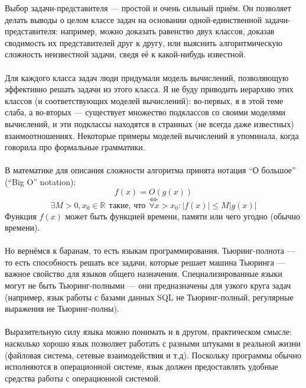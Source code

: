 \documentclass[11pt]{book}
\begin{document}
Выбор задачи-представителя --- простой и очень сильный приём.
Он позволяет делать выводы о целом классе задач на основании одной-единственной задачи-представителя:
например, можно доказать равенство двух классов, доказав сводимость их представителей друг к другу,
или выяснить алгоритмическую сложность неизвестной задачи, сведя её к какой-нибудь известной.
\\ \\
Для каждого класса задач люди придумали модель вычислений, позволяющую эффективно решать задачи из этого класса.
Я не буду приводить иерархию этих классов (и соответствующих моделей вычислений):
во-первых, я в этой теме слаба, а во-вторых --- существует множество подклассов со своими моделями вычислений,
и эти подклассы находятся в странных (не всегда даже известных) взаимоотношениях.
Некоторые примеры моделей вычислений я упоминала, когда говорила про формальные грамматики.
\\ \\
В математике для описания сложности алгоритма принята нотация ``О большое'' (``Big O'' notation):
$$f(x) = O(g(x))$$
$$\Leftrightarrow$$
$$\exists M>0, x_0 \in \mathbb{R} \ \ \text{такие, что}\ \  \forall x>x_0: |f(x)| \leq M |g(x)|$$
Функция $f(x)$ может быть функцией времени, памяти или чего угодно (обычно времени).
\\ \\
Но вернёмся к баранам, то есть языкам программирования.
Тьюринг-полнота --- то есть способность решать все задачи, которые решает машина Тьюринга ---
важное свойство для языков общего назначения.
Специализированные языки могут не быть Тьюринг-полными --- они предназначены для узкого круга задач
(например, язык работы с базами данных SQL не Тьюринг-полный, регулярные выражения не Тьюринг-полны).
\\ \\
Выразительную силу языка можно понимать и в другом, практическом смысле:
насколько хорошо язык позволяет работать с разными штуками в реальной жизни (файловая система, сетевые взаимодействия и т.д).
Поскольку программы обычно исполняются в операционной системе, язык должен предоставлять удобные средства работы
с операционной системой.
\end{document}
